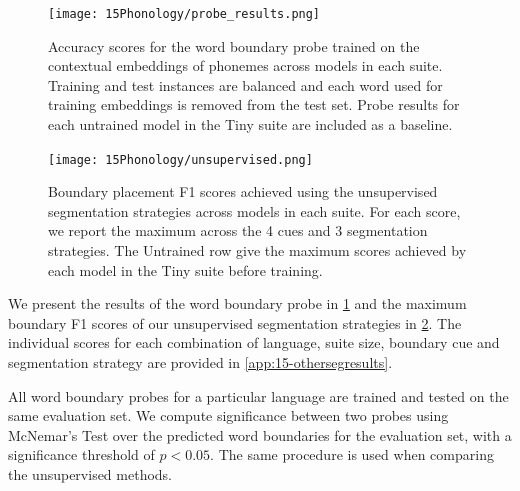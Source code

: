 \begin{figure}[t]
    \centering
    \texttt{[image: 15Phonology/probe\_results.png]}
    \caption{Accuracy scores for the word boundary probe trained on the contextual embeddings of phonemes across models in each suite. Training and test instances are balanced and each word used for training embeddings is removed from the test set. Probe results for each untrained model in the Tiny suite are included as a baseline.}
    \label{fig:15-probes}
\end{figure}

\begin{figure}[t]
    \centering
    \texttt{[image: 15Phonology/unsupervised.png]}
    \caption{Boundary placement F1 scores achieved using the unsupervised segmentation strategies across models in each suite. For each score, we report the maximum across the 4 cues and 3 segmentation strategies. The Untrained row give the maximum scores achieved by each model in the Tiny suite before training.}
    \label{fig:15-unsupervised}
\end{figure}


We present the results of the word boundary probe in \cref{fig:15-probes} and the maximum boundary F1 scores of our unsupervised segmentation strategies in \cref{fig:15-unsupervised}. The individual scores for each combination of language, suite size, boundary cue and segmentation strategy are provided in \cref{app:15-othersegresults}. %

All word boundary probes for a particular language are trained and tested on the same evaluation set. We compute significance between two probes using McNemar’s Test \citep{McNemar_1947} over the predicted word boundaries for the evaluation set, with a significance threshold of $p<0.05$. The same procedure is used when comparing the unsupervised methods.


